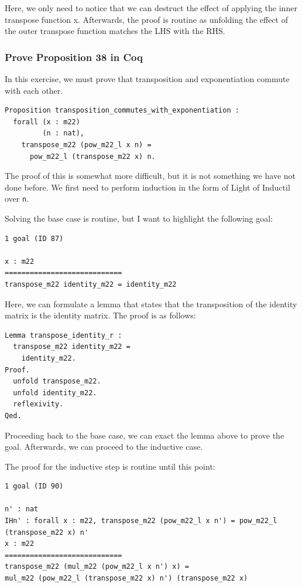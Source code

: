 \documentclass{article}
\begin{document}
Here, we only need to notice that we can destruct the effect of applying the inner transpose function x. Afterwards, the proof is routine as unfolding the effect of the outer transpose function matches the LHS with the RHS.

\subsubsection{Prove Proposition 38 in Coq}

In this exercise, we must prove that transposition and exponentiation commute with each other. 

\begin{lstlisting}
Proposition transposition_commutes_with_exponentiation :
  forall (x : m22)
         (n : nat),
    transpose_m22 (pow_m22_l x n) =
      pow_m22_l (transpose_m22 x) n.
\end{lstlisting}

The proof of this is somewhat more difficult, but it is not something we have not done before. We first need to perform induction in the form of Light of Inductil over \texttt{n}.

Solving the base case is routine, but I want to highlight the following goal:

\begin{lstlisting}
1 goal (ID 87)

x : m22
============================
transpose_m22 identity_m22 = identity_m22
\end{lstlisting}

Here, we can formulate a lemma that states that the transposition of the identity matrix is the identity matrix. The proof is as follows:

\begin{lstlisting}
Lemma transpose_identity_r :
  transpose_m22 identity_m22 =
    identity_m22.
Proof.
  unfold transpose_m22.
  unfold identity_m22.
  reflexivity.
Qed.
\end{lstlisting}

Proceeding back to the base case, we can exact the lemma above to prove the goal. Afterwards, we can proceed to the inductive case.

The proof for the inductive step is routine until this point:

\begin{lstlisting}
1 goal (ID 90)

n' : nat
IHn' : forall x : m22, transpose_m22 (pow_m22_l x n') = pow_m22_l (transpose_m22 x) n'
x : m22
============================
transpose_m22 (mul_m22 (pow_m22_l x n') x) =
mul_m22 (pow_m22_l (transpose_m22 x) n') (transpose_m22 x)
\end{lstlisting}
\end{document}
